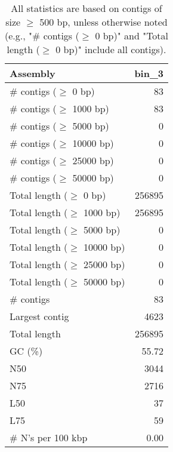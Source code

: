 \documentclass[12pt,a4paper]{article}
\begin{document}
\begin{table}[ht]
\begin{center}
\caption{All statistics are based on contigs of size $\geq$ 500 bp, unless otherwise noted (e.g., "\# contigs ($\geq$ 0 bp)" and "Total length ($\geq$ 0 bp)" include all contigs).}
\begin{tabular}{|l*{1}{|r}|}
\hline
Assembly & bin\_3 \\ \hline
\# contigs ($\geq$ 0 bp) & 83 \\ \hline
\# contigs ($\geq$ 1000 bp) & 83 \\ \hline
\# contigs ($\geq$ 5000 bp) & 0 \\ \hline
\# contigs ($\geq$ 10000 bp) & 0 \\ \hline
\# contigs ($\geq$ 25000 bp) & 0 \\ \hline
\# contigs ($\geq$ 50000 bp) & 0 \\ \hline
Total length ($\geq$ 0 bp) & 256895 \\ \hline
Total length ($\geq$ 1000 bp) & 256895 \\ \hline
Total length ($\geq$ 5000 bp) & 0 \\ \hline
Total length ($\geq$ 10000 bp) & 0 \\ \hline
Total length ($\geq$ 25000 bp) & 0 \\ \hline
Total length ($\geq$ 50000 bp) & 0 \\ \hline
\# contigs & 83 \\ \hline
Largest contig & 4623 \\ \hline
Total length & 256895 \\ \hline
GC (\%) & 55.72 \\ \hline
N50 & 3044 \\ \hline
N75 & 2716 \\ \hline
L50 & 37 \\ \hline
L75 & 59 \\ \hline
\# N's per 100 kbp & 0.00 \\ \hline
\end{tabular}
\end{center}
\end{table}
\end{document}
